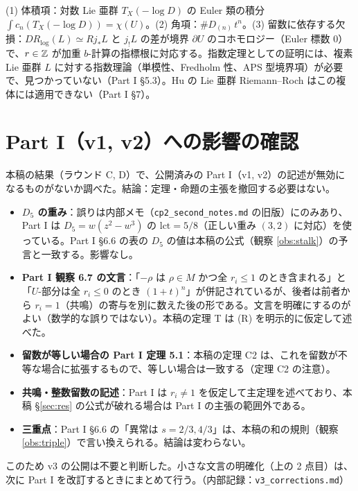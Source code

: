 \begin{obs}[指数理論的な見通し\ \tK]
(1) 体積項：対数 Lie 亜群 $T_X(-\log D)$ の Euler 類の積分 $\int c_n(T_X(-\log D))=\chi(U)$。(2) 角項：$\#D_{(n)}\,t^n$。(3) 留数に依存する欠損：$DR_{\log}(L)\simeq Rj_*L$ と $j_!L$ の差が境界 $\partial U$ のコホモロジー（Euler 標数 0）で、$r\in\mathbb Z$ が加重 $b$-計算の指標根に対応する。指数定理としての証明には、複素 Lie 亜群 $L$ に対する指数理論（単模性、Fredholm 性、APS 型境界項）が必要で、見つかっていない（Part I \S5.3）。Hu の Lie 亜群 Riemann--Roch はこの複体には適用できない（Part I \S7）。
\end{obs}

\section{Part I（v1, v2）への影響の確認}\label{sec:chk}
本稿の結果（ラウンド C, D）で、公開済みの Part I（v1, v2）の記述が無効になるものがないか調べた。結論：定理・命題の主張を撤回する必要はない。

\begin{itemize}
\item \textbf{$D_5$ の重み}：誤りは内部メモ（\texttt{cp2\_second\_notes.md} の旧版）にのみあり、Part I は $D_5=w(z^2-w^3)$ の $\mathrm{lct}=5/8$（正しい重み $(3,2)$ に対応）を使っている。Part I \S6.6 の表の $D_5$ の値は本稿の公式（観察 \ref{obs:stalk}）の予言と一致する。影響なし。\tV
\item \textbf{Part I 観察 6.7 の文言}：「$-\rho$ は $\rho\in M$ かつ全 $r_i\le1$ のとき含まれる」と「$U$-部分は全 $r_i\le0$ のとき $(1+t)^n$」が併記されているが、後者は前者から $r_i=1$（共鳴）の寄与を別に数えた後の形である。文言を明確にするのがよい（数学的な誤りではない）。本稿の定理 T は (R) を明示的に仮定して述べた。
\item \textbf{留数が等しい場合の Part I 定理 5.1}：本稿の定理 C2 は、これを留数が不等な場合に拡張するもので、等しい場合は一致する（定理 C2 の注意）。
\item \textbf{共鳴・整数留数の記述}：Part I は $r_i\ne1$ を仮定して主定理を述べており、本稿 \S\ref{sec:res} の公式が破れる場合は Part I の主張の範囲外である。
\item \textbf{三重点}：Part I \S6.6 の「異常は $s=2/3,4/3$」は、本稿の和の規則（観察 \ref{obs:triple}）で言い換えられる。結論は変わらない。
\end{itemize}
このため v3 の公開は不要と判断した。小さな文言の明確化（上の 2 点目）は、次に Part I を改訂するときにまとめて行う。（内部記録：\texttt{v3\_corrections.md}）

